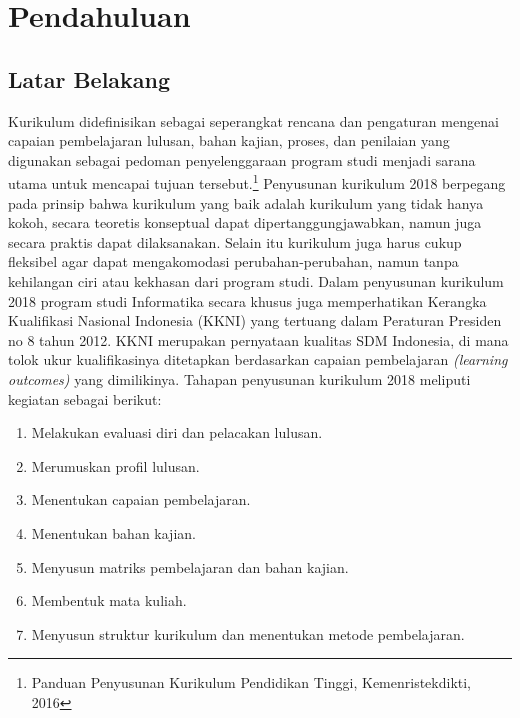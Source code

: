 \chapter{Pendahuluan}
\label{chap:Pendahuluan}
   
\section{Latar Belakang}
\label{sec:Latar Belakang}

Kurikulum didefinisikan sebagai seperangkat rencana dan pengaturan mengenai capaian pembelajaran 
lulusan, bahan kajian, proses, dan penilaian yang digunakan sebagai pedoman penyelenggaraan program studi menjadi sarana utama untuk mencapai tujuan tersebut.\footnote{Panduan Penyusunan Kurikulum Pendidikan Tinggi, Kemenristekdikti, 2016} Penyusunan kurikulum 2018 berpegang pada prinsip bahwa 
kurikulum yang baik adalah kurikulum yang tidak hanya kokoh, secara teoretis konseptual dapat dipertanggungjawabkan, namun juga secara praktis dapat dilaksanakan. Selain itu kurikulum juga harus cukup fleksibel agar dapat mengakomodasi perubahan-perubahan, namun tanpa kehilangan ciri atau kekhasan dari program studi. Dalam penyusunan kurikulum 2018 program studi Informatika secara khusus juga memperhatikan Kerangka Kualifikasi Nasional Indonesia (KKNI) yang tertuang dalam Peraturan Presiden no 8 tahun 2012. KKNI merupakan pernyataan kualitas SDM Indonesia, di mana tolok ukur kualifikasinya ditetapkan berdasarkan capaian 
pembelajaran \textit{(learning outcomes)} yang dimilikinya. Tahapan penyusunan kurikulum 2018 meliputi kegiatan sebagai berikut: 
\begin{enumerate}
\item Melakukan evaluasi diri dan pelacakan lulusan.
\item Merumuskan profil lulusan.
\item Menentukan capaian pembelajaran.
\item Menentukan bahan kajian.
\item Menyusun matriks pembelajaran dan bahan kajian.
\item Membentuk mata kuliah.
\item Menyusun struktur kurikulum dan menentukan metode pembelajaran.
\end{enumerate}

